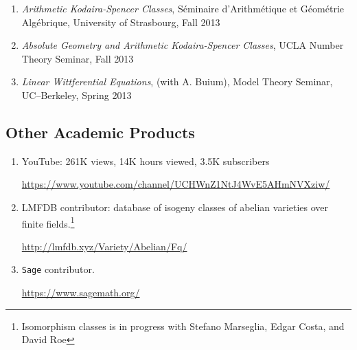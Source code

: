 \documentclass[a4paper,10pt]{article}
\begin{document}
\begin{enumerate}
	\item \emph{Arithmetic Kodaira-Spencer Classes}, S\'eminaire d'Arithm\'etique et G\'eom\'etrie Alg\'ebrique, University of Strasbourg, Fall 2013
	\item \emph{Absolute Geometry and Arithmetic Kodaira-Spencer Classes}, UCLA Number Theory Seminar, Fall 2013
	\item \emph{Linear Wittferential Equations}, (with A. Buium), Model Theory Seminar, UC--Berkeley, Spring 2013
\end{enumerate}

\subsection*{Other Academic Products}
\begin{enumerate}
	\item YouTube: 261K views, 14K hours viewed, 3.5K subscribers
	\begin{center}
		 \url{https://www.youtube.com/channel/UCHWnZ1NtJ4WvE5AHmNVXziw/}
	\end{center}
	\item LMFDB contributor: database of isogeny classes of abelian varieties over finite fields.\footnote{Isomorphism classes is in progress with Stefano Marseglia, Edgar Costa, and David Roe}
	 \begin{center}
	 	\url{http://lmfdb.xyz/Variety/Abelian/Fq/}
	 \end{center}
	\item \texttt{Sage} contributor. 
	\begin{center}
			\url{https://www.sagemath.org/}
	\end{center}
\end{enumerate}
\end{document}
